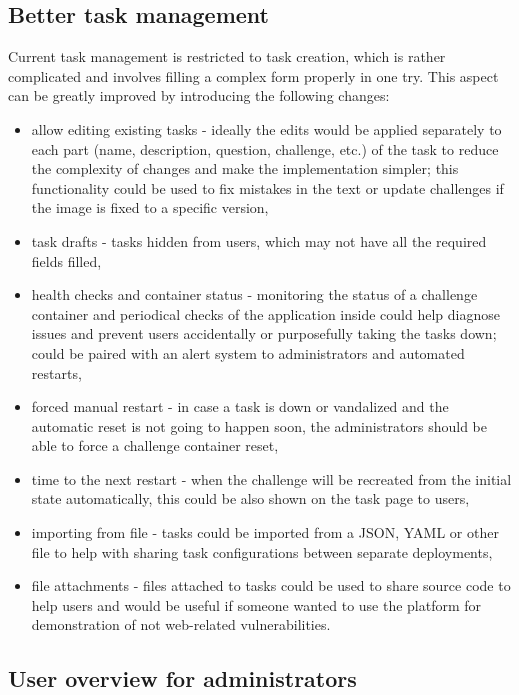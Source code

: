 \subsection{Better task management}

Current task management is restricted to task creation, which is rather complicated and involves filling a complex form properly in one try. This aspect can be greatly improved by introducing the following changes:
\begin{itemize}
	\item allow editing existing tasks - ideally the edits would be applied separately to each part (name, description, question, challenge, etc.) of the task to reduce the complexity of changes and make the implementation simpler; this functionality could be used to fix mistakes in the text or update challenges if the image is fixed to a specific version,
	\item task drafts - tasks hidden from users, which may not have all the required fields filled,
	\item health checks and container status - monitoring the status of a challenge container and periodical checks of the application inside could help diagnose issues and prevent users accidentally or purposefully taking the tasks down; could be paired with an alert system to administrators and automated restarts,
	\item forced manual restart - in case a task is down or vandalized and the automatic reset is not going to happen soon, the administrators should be able to force a challenge container reset,
	\item time to the next restart - when the challenge will be recreated from the initial state automatically, this could be also shown on the task page to users,
	\item importing from file - tasks could be imported from a JSON, YAML or other file to help with sharing task configurations between separate deployments,
	\item file attachments - files attached to tasks could be used to share source code to help users and would be useful if someone wanted to use the platform for demonstration of not web-related vulnerabilities.
\end{itemize}

\subsection{User overview for administrators}

